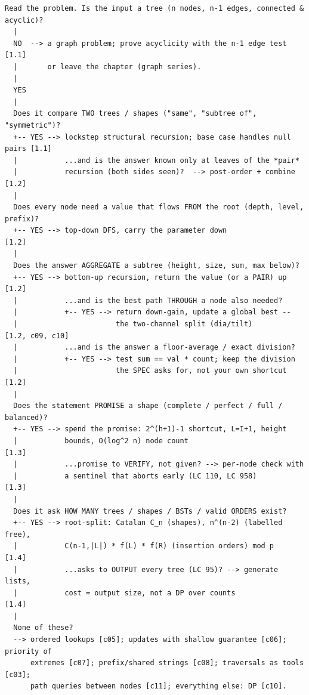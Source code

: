 \begin{lstlisting}[language={}, basicstyle=\ttfamily\small, numbers=none, frame=single]
  Read the problem. Is the input a tree (n nodes, n-1 edges, connected & acyclic)?
  |
  NO  --> a graph problem; prove acyclicity with the n-1 edge test    [1.1]
  |       or leave the chapter (graph series).
  |
  YES
  |
  Does it compare TWO trees / shapes ("same", "subtree of", "symmetric")?
  +-- YES --> lockstep structural recursion; base case handles null pairs [1.1]
  |           ...and is the answer known only at leaves of the *pair*
  |           recursion (both sides seen)?  --> post-order + combine     [1.2]
  |
  Does every node need a value that flows FROM the root (depth, level, prefix)?
  +-- YES --> top-down DFS, carry the parameter down                     [1.2]
  |
  Does the answer AGGREGATE a subtree (height, size, sum, max below)?
  +-- YES --> bottom-up recursion, return the value (or a PAIR) up       [1.2]
  |           ...and is the best path THROUGH a node also needed?
  |           +-- YES --> return down-gain, update a global best --
  |                       the two-channel split (dia/tilt)          [1.2, c09, c10]
  |           ...and is the answer a floor-average / exact division?
  |           +-- YES --> test sum == val * count; keep the division
  |                       the SPEC asks for, not your own shortcut       [1.2]
  |
  Does the statement PROMISE a shape (complete / perfect / full / balanced)?
  +-- YES --> spend the promise: 2^(h+1)-1 shortcut, L=I+1, height
  |           bounds, O(log^2 n) node count                             [1.3]
  |           ...promise to VERIFY, not given? --> per-node check with
  |           a sentinel that aborts early (LC 110, LC 958)              [1.3]
  |
  Does it ask HOW MANY trees / shapes / BSTs / valid ORDERS exist?
  +-- YES --> root-split: Catalan C_n (shapes), n^(n-2) (labelled free),
  |           C(n-1,|L|) * f(L) * f(R) (insertion orders) mod p          [1.4]
  |           ...asks to OUTPUT every tree (LC 95)? --> generate lists,
  |           cost = output size, not a DP over counts                   [1.4]
  |
  None of these?
  --> ordered lookups [c05]; updates with shallow guarantee [c06]; priority of
      extremes [c07]; prefix/shared strings [c08]; traversals as tools [c03];
      path queries between nodes [c11]; everything else: DP [c10].
\end{lstlisting}


